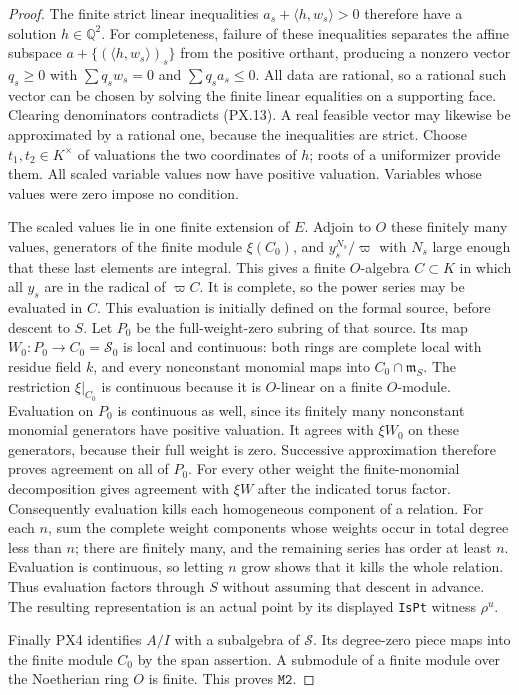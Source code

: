 \begin{proof}
The finite strict linear inequalities
$a_s+\langle h,w_s\rangle>0$ therefore have a
solution $h\in\mathbb Q^2$.  For completeness,
failure of these inequalities separates the affine
subspace $a+\{(\langle h,w_s\rangle)_s\}$ from
the positive orthant, producing a nonzero vector
$q_s\ge0$ with $\sum q_sw_s=0$ and
$\sum q_sa_s\le0$.  All data are rational, so
a rational such vector can be chosen by solving
the finite linear equalities on a supporting face.
Clearing denominators contradicts (PX.13).
A real feasible vector may likewise be approximated
by a rational one, because the inequalities are
strict.  Choose $t_1,t_2\in K^\times$ of valuations
the two coordinates of $h$; roots of a uniformizer
provide them.  All scaled variable values now have
positive valuation.  Variables whose values were
zero impose no condition.

The scaled values lie in one finite extension of
$E$.  Adjoin to $O$ these finitely many values,
generators of the finite module $\xi(C_0)$, and
$y_s^{N_s}/\varpi$ with $N_s$ large enough that
these last elements are integral.  This gives a
finite $O$-algebra $C\subset K$ in which all $y_s$
are in the radical of $\varpi C$.  It is complete,
so the power series may be evaluated in $C$.
This evaluation is initially defined on the formal
source, before descent to $S$.  Let $P_0$ be the
full-weight-zero subring of that source.  Its map
$W_0:P_0\to C_0=\mathcal S_0$ is local and continuous:
both rings are complete local with residue field $k$,
and every nonconstant monomial maps into
$C_0\cap\mathfrak m_S$.  The restriction $\xi|_{C_0}$
is continuous because it is $O$-linear on a finite
$O$-module.  Evaluation on $P_0$ is continuous as
well, since its finitely many nonconstant monomial
generators have positive valuation.  It agrees with
$\xi W_0$ on these generators, because their full
weight is zero.  Successive approximation therefore
proves agreement on all of $P_0$.
For every other weight the finite-monomial
decomposition gives agreement with $\xi W$ after
the indicated torus factor.  Consequently evaluation
kills each homogeneous component of a relation.
For each $n$, sum the complete weight components
whose weights occur in total degree less than $n$;
there are finitely many, and the remaining series
has order at least $n$.  Evaluation is continuous,
so letting $n$ grow shows that it kills the whole
relation.  Thus evaluation factors through $S$
without assuming that descent in advance.  The
resulting representation is an actual point by its
displayed \texttt{IsPt} witness $\rho^u$.

Finally PX4 identifies $A/I$ with a subalgebra of
$\mathcal S$.  Its degree-zero piece maps into the
finite module $C_0$ by the span assertion.  A
submodule of a finite module over the Noetherian
ring $O$ is finite.  This proves $\mathtt{M2}$.
\end{proof}

